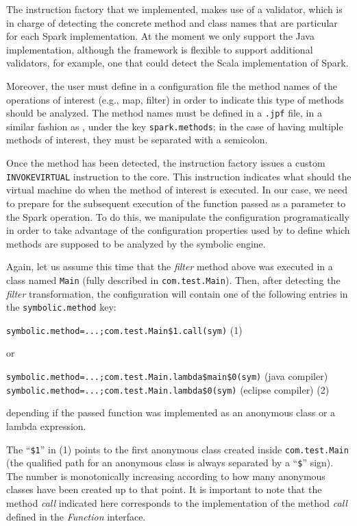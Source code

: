The instruction factory that we implemented, makes use of a validator, which is in charge of detecting the concrete method and class names that are particular for each Spark implementation. At the moment we only support the Java implementation, although the framework is flexible to support additional validators, for example, one that could detect the Scala implementation of Spark.

Moreover, the user must define in a configuration file the method names of the operations of interest (e.g., map, filter) in order to indicate this type of methods should be analyzed. The method names must be defined in a \texttt{.jpf} file, in a similar fashion as \spf{}, under the key \texttt{spark.methods}; in the case of having multiple methods of interest, they must be separated with a semicolon.

Once the method has been detected, the instruction factory issues a custom \texttt{INVOKEVIRTUAL} instruction to the \jpf{} core. This instruction indicates what should the \jpf{} virtual machine do when the method of interest is executed. In our case, we need to prepare for the subsequent execution of the function passed as a parameter to the Spark operation. To do this, we manipulate the \jpf{} configuration programatically in order to take advantage of the configuration properties used by \spf{} to define which methods are supposed to be analyzed by the symbolic engine.

Again, let us assume this time that the \textit{filter} method above was executed in a class named \texttt{Main} (fully described in \texttt{com.test.Main}). Then, after detecting the \textit{filter} transformation, the configuration will contain one of the following entries in the \texttt{symbolic.method} key:

\hspace*{1cm} \lstinline[]|symbolic.method=...;com.test.Main$1.call(sym)|  \hfill (1)

or

\hspace*{1cm} \lstinline[]|symbolic.method=...;com.test.Main.lambda$main$0(sym)| (java compiler) \\
\hspace*{1cm} \lstinline[]|symbolic.method=...;com.test.Main.lambda$0(sym)| (eclipse compiler) \hfill (2)

depending if the passed function was implemented as an anonymous class or a lambda expression. 

The ``\texttt{\$1}'' in (1) points to the first anonymous class created inside \texttt{com.test.Main} (the qualified path for an anonymous class is always separated by a ``\texttt{\$}'' sign). The number is monotonically increasing according to how many anonymous classes have been created up to that point. It is important to note that the method \textit{call} indicated here corresponds to the implementation of the method \textit{call} defined in the \textit{Function} interface.

